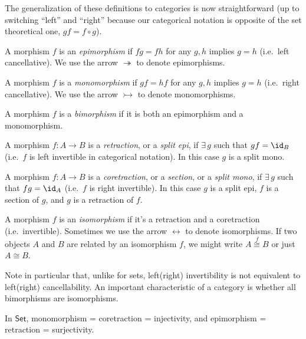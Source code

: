 The generalization of these definitions to categories is now straightforward
(up to switching ``left'' and ``right'' because our categorical
notation is opposite of the set theoretical one, $gf=f\circ g$).
\begin{defn}[Epimorphism]
A morphism $f$ is an \emph{epimorphism} if $fg=fh$ for any $g,h$
implies $g=h$ (i.e.\ left cancellative). We use the arrow $\twoheadrightarrow$ to denote epimorphisms.
\end{defn}
%
\begin{defn}[Monomorphism]
A morphism $f$ is a \emph{monomorphism} if $gf=hf$ for any $g,h$
implies $g=h$ (i.e.\ right cancellative). We use the arrow $\rightarrowtail$ to denote monomorphisms.
\end{defn}
%
\begin{defn}[Bimorphism]
A morphism $f$ is a \emph{bimorphism} if it is both an epimorphism
and a monomorphism.
\end{defn}
%
\begin{defn}
A morphism $f:A\rightarrow B$ is a \emph{retraction}, or a\emph{
split epi}, if $\exists\,g$ such that $gf=\id_{B}$ (i.e.\ $f$ is
left invertible in categorical notation). In this case $g$ is a split
mono.
\end{defn}
%
\begin{defn}
A morphism $f:A\rightarrow B$ is a \emph{coretraction}, or a \emph{section},
or a \emph{split mono}, if $\exists\,g$ such that $fg=\id_{A}$
(i.e.\ $f$ is right invertible). In this case $g$ is a split epi, $f$ is a section of $g$, and $g$ is a retraction of $f$.
\end{defn}
%
\begin{defn}[Isomorphism]
A morphism $f$ is an \emph{isomorphism} if it's a retraction and
a coretraction (i.e.\ invertible). Sometimes we use the arrow $\leftrightarrow$ to denote isomorphisms. If two objects $A$ and $B$ are related by an isomorphism $f$, we might write $A\overset f\cong B$ or just $A\cong B$.
\end{defn}
Note in particular that, unlike for sets, left(right) invertibility
is not equivalent to left(right) cancellability. An important characteristic
of a category is whether all bimorphisms are isomorphisms.
\begin{prop}
In $\mathsf{Set}$, monomorphism = coretraction = injectivity, and
epimorphism = retraction = surjectivity.
\end{prop}
